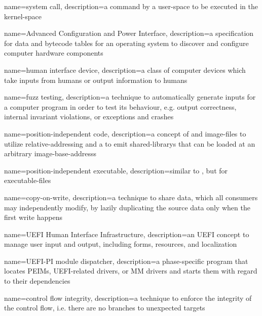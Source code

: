 {
  name={system call},
  description={a command by a \gls{user-space} to be executed in the \gls{kernel-space}}
}

{
  name={Advanced Configuration and Power Interface},
  description={a specification for data and bytecode tables for an operating system to discover and configure computer hardware components}
}

{
  name={human interface device},
  description={a class of computer devices which take inputs from humans or output information to humans}
}

{
  name={fuzz testing},
  description={a technique to automatically generate inputs for a computer program in order to test its behaviour, e.g. output correctness, internal invariant violations, or exceptions and crashes}
}

{
  name={position-independent code},
  description={a concept of  and  \glspl{image-file} to utilize \gls{relative-addressing} and a  to emit \glspl{shared-library} that can be loaded at an arbitrary \glspl{image-base-address}}
}

{
  name={position-independent executable},
  description={similar to , but for \glspl{executable-file}}
}

{
  name={copy-on-write},
  description={a technique to share data, which all consumers may independently modify, by lazily duplicating the source data only when the first write happens}
}

{
  name={\gls{UEFI} Human Interface Infrastructure},
  description={an \gls{UEFI} concept to manage user input and output, including forms, resources, and localization}
}

{
  name={\gls{UEFI-PI} module dispatcher},
  description={a phase-specific program that locates \glspl{PEIM}, \gls{UEFI}-related drivers, or \gls{MM} drivers and starts them with regard to their dependencies}
}

{
  name={control flow integrity},
  description={a technique to enforce the integrity of the control flow, i.e. there are no branches to unexpected targets}
}

